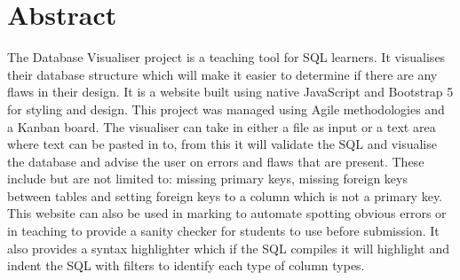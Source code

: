 \thispagestyle{empty}

\section*{\centering Abstract}

The Database Visualiser project is a teaching tool for SQL learners. It visualises their database structure which will make it easier to determine if there are any flaws in their design. It is a website built using native JavaScript and Bootstrap 5 for styling and design. This project was managed using Agile methodologies and a Kanban board. The visualiser can take in either a file as input or a text area where text can be pasted in to, from this it will validate the SQL and visualise the database and advise the user on errors and flaws that are present. These include but are not limited to: missing primary keys, missing foreign keys between tables and setting foreign keys to a column which is not a primary key. This website can also be used in marking to automate spotting obvious errors or in teaching to provide a sanity checker for students to use before submission. It also provides a syntax highlighter which if the SQL compiles it will highlight and indent the SQL with filters to identify each type of column types.

